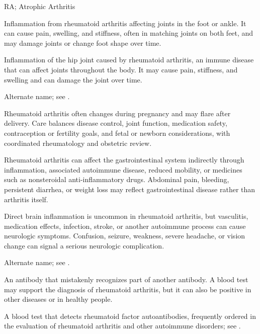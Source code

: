\synonyms
RA; Atrophic Arthritis

 Inflammation from rheumatoid arthritis affecting joints in the foot or ankle. It can cause pain, swelling, and stiffness, often in matching joints on both feet, and may damage joints or change foot shape over time.

 Inflammation of the hip joint caused by rheumatoid arthritis, an immune disease that can affect joints throughout the body. It may cause pain, stiffness, and swelling and can damage the joint over time.

 Alternate name; see .

 Rheumatoid arthritis often changes during pregnancy and may flare after delivery. Care balances disease control, joint function, medication safety, contraception or fertility goals, and fetal or newborn considerations, with coordinated rheumatology and obstetric review.

 Rheumatoid arthritis can affect the gastrointestinal system indirectly through inflammation, associated autoimmune disease, reduced mobility, or medicines such as nonsteroidal anti-inflammatory drugs. Abdominal pain, bleeding, persistent diarrhea, or weight loss may reflect gastrointestinal disease rather than arthritis itself.

 Direct brain inflammation is uncommon in rheumatoid arthritis, but vasculitis, medication effects, infection, stroke, or another autoimmune process can cause neurologic symptoms. Confusion, seizure, weakness, severe headache, or vision change can signal a serious neurologic complication.

 Alternate name; see .

 An antibody that mistakenly recognizes part of another antibody. A blood test may support the diagnosis of rheumatoid arthritis, but it can also be positive in other diseases or in healthy people.

 A blood test that detects rheumatoid factor autoantibodies, frequently ordered in the evaluation of rheumatoid arthritis and other autoimmune disorders; see .

